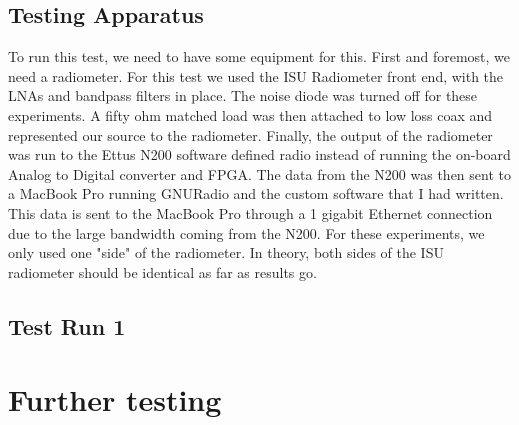 \subsection{Testing Apparatus}
To run this test, we need to have some equipment for this.  First and foremost, we need a radiometer.  For this test we used the ISU Radiometer front end, with the LNAs and bandpass filters in place.  The noise diode was turned off for these experiments.  A fifty ohm matched load was then attached to low loss coax and represented our source to the radiometer.  Finally, the output of the radiometer was run to the Ettus N200 software defined radio instead of running the on-board Analog to Digital converter and FPGA.  The data from the N200 was then sent to a MacBook Pro running GNURadio and the custom software that I had written.  This data is sent to the MacBook Pro through a 1 gigabit Ethernet connection due to the large bandwidth coming from the N200.  For these experiments, we only used one "side" of the radiometer.  In theory, both sides of the ISU radiometer should be identical as far as results go.
\subsection{Test Run 1}

\section{Further testing}